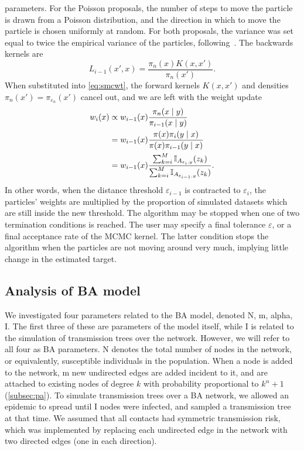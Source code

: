 parameters. For the Poisson proposals, the number of steps to move the particle
is drawn from a Poisson distribution, and the direction in which to move the
particle is chosen uniformly at random. For both proposals, the variance was
set equal to twice the empirical variance of the particles,
following~\autocite{beaumont2009adaptive, del2012adaptive}. The backwards
kernels are
\[
  L_{i-1}(x', x) = \frac{\pi_n(x)K(x, x')}{\pi_n(x')}.
\]
When substituted into \cref{eq:smcwt}, the forward kernels $K(x, x')$ and
densities $\pi_n(x') = \pi_{\varepsilon_n}(x')$ cancel out, and we are left
with the weight update 
\begin{align*}
  w_i(x) 
    &\propto w_{i-1}(x) \frac{\pi_n(x \mid y)}{\pi_{i-1}(x \mid y)} \\
    &= w_{i-1}(x) \frac{\pi(x) \pi_i(y \mid x)}{\pi(x) \pi_{i-1}(y \mid x)} \\
    &= w_{i-1}(x) \frac{\sum_{k=i}^M \mathbb{I}_{A_{\varepsilon_i, y}}(z_k)}
            {\sum_{k=i}^M \mathbb{I}_{A_{\varepsilon_{i-1}, y}}(z_k)}.
\end{align*}
In other words, when the distance threshold $\varepsilon_{i-1}$ is contracted
to $\varepsilon_i$, the particles' weights are multiplied by the proportion of
simulated datasets which are still inside the new threshold. The algorithm may
be stopped when one of two termination conditions is reached. The user may
specify a final tolerance $\varepsilon$, or a final acceptance rate of the
\gls{MCMC} kernel. The latter condition stops the algorithm when the particles
are not moving around very much, implying little change in the estimated
target.

\subsection{Analysis of \acrlong{BA} model}

We investigated four parameters related to the \gls{BA} model, denoted
\gls{N}, \gls{m}, \gls{alpha}, \gls{I}. The first three of these are parameters
of the model itself, while \gls{I} is related to the simulation of transmission
trees over the network. However, we will refer to all four as \gls{BA}
parameters. \gls{N} denotes the total number of nodes in the network, or
equivalently, susceptible individuals in the population. When a node is added
to the network, \gls{m} new undirected edges are added incident to it, and are
attached to existing nodes of degree $k$ with probability proportional to
$k^\alpha + 1$ (\cref{subsec:pa}). To simulate transmission trees over a
\gls{BA} network, we allowed an epidemic to spread until \gls{I} nodes were
infected, and sampled a transmission tree at that time. We assumed that all
contacts had symmetric transmission risk, which was implemented by replacing
each undirected edge in the network with two directed edges (one in each
direction).

